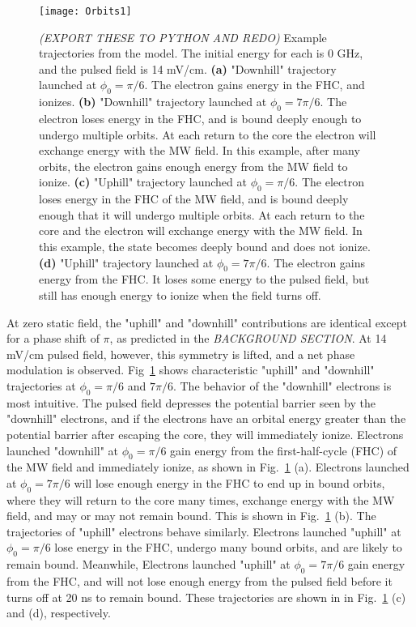 \documentclass[aps,pra,preprint,groupedaddress]{revtex4-1}
\begin{document}
\begin{figure}
	\texttt{[image: Orbits1]}
	\caption{\emph{(EXPORT THESE TO PYTHON AND REDO)} Example trajectories from the model. The initial energy for each is 0 GHz, and the pulsed field is 14 mV/cm.
	\textbf{(a)} "Downhill" trajectory launched at $\phi_0 = \pi/6$. The electron gains energy in the FHC, and ionizes.
	\textbf{(b)} "Downhill" trajectory launched at $\phi_0 = 7\pi/6$. The electron loses energy in the FHC, and is bound deeply enough to undergo multiple orbits. At each return to the core the electron will exchange energy with the MW field. In this example, after many orbits, the electron gains enough energy from the MW field to ionize.
	\textbf{(c)} "Uphill" trajectory launched at $\phi_0 = \pi/6$. The electron loses energy in the FHC of the MW field, and is bound deeply enough that it will undergo multiple orbits. At each return to the core and the electron will exchange energy with the MW field. In this example, the state becomes deeply bound and does not ionize.
	\textbf{(d)} "Uphill" trajectory launched at $\phi_0 = 7\pi/6$. The electron gains energy from the FHC. It loses some energy to the pulsed field, but still has enough energy to ionize when the field turns off.}
	\label{fig:Orb1}
\end{figure}

At zero static field, the "uphill" and "downhill" contributions are identical except for a phase shift of $\pi$, as predicted in the \emph{BACKGROUND SECTION}. At 14 mV/cm pulsed field, however, this symmetry is lifted, and a net phase modulation is observed. Fig~\ref{fig:Orb1} shows characteristic "uphill" and "downhill" trajectories at $\phi_0 = \pi/6$ and $7\pi/6$. The behavior of the "downhill" electrons is most intuitive. The pulsed field depresses the potential barrier seen by the "downhill" electrons, and if the electrons have an orbital energy greater than the potential barrier after escaping the core, they will immediately ionize. Electrons launched "downhill" at $\phi_0 = \pi/6$ gain energy from the first-half-cycle (FHC) of the MW field and immediately ionize, as shown in Fig.~\ref{fig:Orb1} (a). Electrons launched at $\phi_0 = 7\pi/6$ will lose enough energy in the FHC to end up in bound orbits, where they will return to the core many times, exchange energy with the MW field, and may or may not remain bound. This is shown in Fig.~\ref{fig:Orb1} (b). The trajectories of "uphill" electrons behave similarly. Electrons launched "uphill" at $\phi_0 = \pi/6$ lose energy in the FHC, undergo many bound orbits, and are likely to remain bound. Meanwhile, Electrons launched "uphill" at $\phi_0 = 7\pi/6$ gain energy from the FHC, and will not lose enough energy from the pulsed field before it turns off at 20 ns to remain bound. These trajectories are shown in in Fig.~\ref{fig:Orb1} (c) and (d), respectively.
\end{document}
